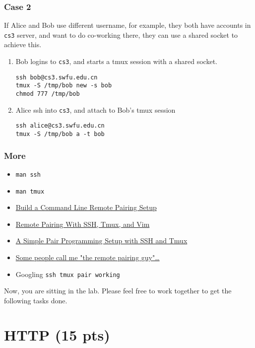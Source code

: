 \documentclass{article} [NO-DEFAULT-PACKAGES] \usepackage{wx672hyperref}
\begin{document}
\subsubsection{Case 2}
\label{sec:org5b7463c}
If Alice and Bob use different username, for example, they both have accounts in \texttt{cs3}
server, and want to do co-working there, they can use a shared socket to achieve this.
\begin{enumerate}
\item Bob logins to \texttt{cs3}, and starts a tmux session with a shared socket.
\begin{verbatim}
ssh bob@cs3.swfu.edu.cn
tmux -S /tmp/bob new -s bob
chmod 777 /tmp/bob
\end{verbatim}
\item Alice ssh into \texttt{cs3}, and attach to Bob's tmux session
\begin{verbatim}
ssh alice@cs3.swfu.edu.cn
tmux -S /tmp/bob a -t bob
\end{verbatim}
\end{enumerate}

\subsubsection{More}
\label{sec:org1c72dfe}
\begin{itemize}
\item \texttt{man ssh}
\item \texttt{man tmux}
\item \href{http://www.zeespencer.com/building-a-remote-pairing-setup/}{Build a Command Line Remote Pairing Setup}
\item \href{http://blog.stevenhaddox.com/2012/04/11/remote-pairing-with-ssh-tmux-vim}{Remote Pairing With SSH, Tmux, and Vim}
\item \href{http://collectiveidea.com/blog/archives/2014/02/18/a-simple-pair-programming-setup-with-ssh-and-tmux/}{A Simple Pair Programming Setup with SSH and Tmux}
\item \href{http://evan.tiggerpalace.com/articles/2011/10/17/some-people-call-me-the-remote-pairing-guy-/}{Some people call me "the remote pairing guy"\ldots{}}
\item Googling \texttt{ssh tmux pair working}
\end{itemize}

Now, you are sitting in the lab. Please feel free to work together to get the following
tasks done.

\section{HTTP (15 pts)}
\label{sec:org7c2982f}
\end{document}
